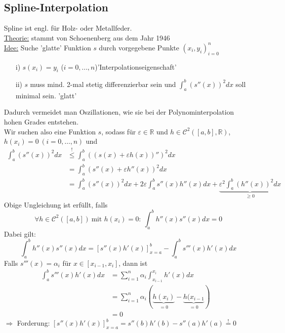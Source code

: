\documentclass[12pt]{article}
\theoremstyle{break}
\begin{document}
\subsection{Spline-Interpolation}
Spline ist engl. für Holz- oder Metallfeder.\\
\underline{Theorie:} stammt von Schoenenberg aus dem Jahr 1946\\
\underline{Idee:} Suche 'glatte' Funktion $s$ durch vorgegebene Punkte $(x_i, y_i)_{i=0}^n$
\begin{enumerate}
  \item[i)] $s(x_i)= y_i$ ($i=0,...,n$)'Interpolationseigenschaft'
  \item[ii)] $s$ muss mind. 2-mal stetig differenzierbar sein und $ \int_a^b (s''(x))^2dx $ soll minimal sein. 'glatt'
\end{enumerate}
Dadurch vermeidet man Oszillationen, wie sie bei der Polynominterpolation hohen Grades entstehen.\\
Wir suchen also eine Funktion $s$, sodass für $\varepsilon \in \mathbb{R}$ und $h \in \mathcal{C}^2([a,b], \mathbb{R})$, $h(x_i) = 0 \medspace (i=0,\ldots,n)$ und 
\begin{align*}
\int_a^b (s''(x))^2 dx &\overset{!}{\leq} \int_a^b \left( (s(x) + \varepsilon h(x))'' \right)^2 dx &\\
&= \int_a^b (s''(x) + \varepsilon h''(x))^2 dx &\\
&= \int_a^b (s''(x))^2 dx + 2\varepsilon \int_a^b s''(x)h''(x) dx + \underbrace{\varepsilon^2\int_a^b (h''(x))^2dx}_{ \geq 0 } 
\end{align*}
Obige Ungleichung ist erfüllt, falls 
$$ \forall h \in \mathcal{C}^2([a,b]) \medspace \text{mit }h(x_i) = 0: \medspace \int_a^b h''(x) s''(x) dx = 0$$
Dabei gilt:
$$ \int_a^b h''(x) s''(x) dx = \left[ s''(x) h'(x) \right]_{x=a}^b - \int_a^b s'''(x) h'(x)dx$$
Falls $s'''(x) = \alpha_i$ für $x \in [x_{i-1}, x_i]$, dann ist 
\begin{align*}
\int_a^b s'''(x) h'(x) dx &= \sum_{i=1}^n \alpha_i \int_{x_{i-1}}^{x_i} h'(x) dx &\\
&= \sum_{i=1}^n \alpha_i \left(\underbrace{h(x_i)}_{= 0} - \underbrace{h(x_{i-1}}_{= 0}\right) &\\
&= 0
\end{align*}
$\Rightarrow$ Forderung: $\left[s''(x) h'(x) \right]_{x=a}^b = s''(b)h'(b) - s''(a)h'(a) \overset{!}{=} 0$
\end{document}
